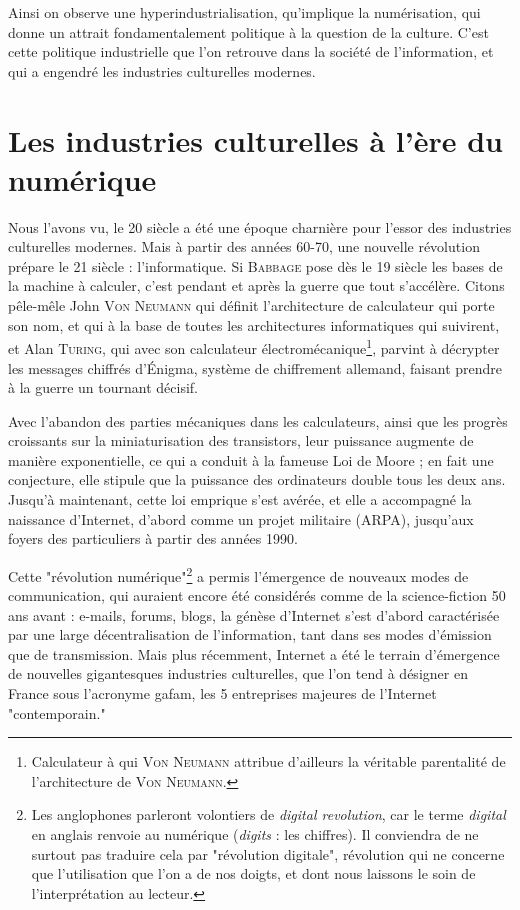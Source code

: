 \documentclass[a4paper,14pt]{extreport}
\begin{document}
Ainsi on observe une hyperindustrialisation, qu'implique la numérisation, qui donne un attrait fondamentalement politique à la question de la culture. C'est cette politique industrielle que l'on retrouve dans la société de l'information, et qui a engendré les industries culturelles modernes.

\section{Les industries culturelles à l'ère du numérique}

Nous l'avons vu, le 20 siècle a été une époque charnière pour l'essor des industries culturelles modernes. Mais à partir des années 60-70, une nouvelle révolution prépare le 21 siècle : l'informatique. Si \textsc{Babbage} pose dès le 19 siècle les bases de la machine à calculer, c'est pendant et après la guerre que tout s'accélère. Citons pêle-mêle John \textsc{Von Neumann} qui définit l'architecture de calculateur qui porte son nom, et qui à la base de toutes les architectures informatiques qui suivirent, et Alan \textsc{Turing}, qui avec son calculateur électromécanique\footnote{Calculateur à qui \textsc{Von Neumann} attribue d'ailleurs la véritable parentalité de l'architecture de \textsc{Von Neumann}.}, parvint à décrypter les messages chiffrés d'Énigma, système de chiffrement allemand, faisant prendre à la guerre un tournant décisif.

Avec l'abandon des parties mécaniques dans les calculateurs, ainsi que les progrès croissants sur la miniaturisation des transistors, leur puissance augmente de manière exponentielle, ce qui a conduit à la fameuse Loi de Moore ; en fait une conjecture, elle stipule que la puissance des ordinateurs double tous les deux ans. Jusqu'à maintenant, cette loi emprique s'est avérée, et elle a accompagné la naissance d'Internet, d'abord comme un projet militaire (ARPA), jusqu'aux foyers des particuliers à partir des années 1990.

Cette "révolution numérique"\footnote{Les anglophones parleront volontiers de \textit{digital revolution}, car le terme \textit{digital} en anglais renvoie au numérique (\textit{digits} : les chiffres). Il conviendra de ne surtout pas traduire cela par "révolution digitale", révolution qui ne concerne que l'utilisation que l'on a de nos doigts, et dont nous laissons le soin de l'interprétation au lecteur.} a permis l'émergence de nouveaux modes de communication, qui auraient encore été considérés comme de la science-fiction 50 ans avant : e-mails, forums, blogs, la génèse d'Internet s'est d'abord caractérisée par une large décentralisation de l'information, tant dans ses modes d'émission que de transmission. Mais plus récemment, Internet a été le terrain d'émergence de nouvelles gigantesques industries culturelles, que l'on tend à désigner en France sous l'acronyme \gls{gafam}, les 5 entreprises majeures de l'Internet "contemporain."
\end{document}
